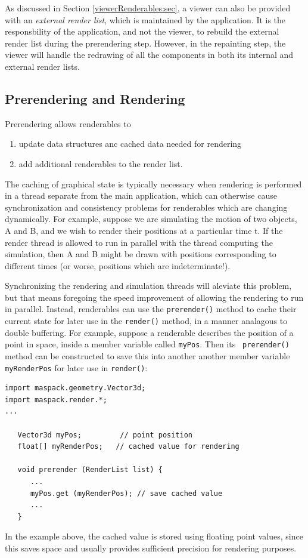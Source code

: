 As discussed in Section \ref{viewerRenderables:sec}, a viewer can also
be provided with an {\it external render list}, which is maintained by
the application. It is the responsbility of the application, and not
the viewer, to rebuild the external render list during the
prerendering step. However, in the repainting step, the viewer will
handle the redrawing of all the components in both its internal and
external render lists.

\subsection{Prerendering and Rendering}
\label{prerenderingAndRendering:sec}

Prerendering allows renderables to

\begin{enumerate}

\item update data structures anc cached data needed for rendering

\item add additional renderables to the render list.

\end{enumerate}

The caching of graphical state is typically necessary when rendering
is performed in a thread separate from the main application, which can
otherwise cause synchronization and consistency problems for
renderables which are changing dynamically. For example, suppose we
are simulating the motion of two objects, A and B, and we wish to
render their positions at a particular time t. If the render thread is
allowed to run in parallel with the thread computing the simulation,
then A and B might be drawn with positions corresponding to different
times (or worse, positions which are indeterminate!).

Synchronizing the rendering and simulation threads will aleviate this
problem, but that means foregoing the speed improvement of allowing
the rendering to run in parallel. Instead, renderables can use the
{\tt prerender()} method to cache their current state for later use in
the {\tt render()} method, in a manner analagous to double buffering.
For example, suppose a renderable describes the position of a point in
space, inside a member variable called {\tt myPos}. Then its {\tt
prerender()} method can be constructed to save this into
another another member variable {\tt myRenderPos} for later use in
{\tt render()}:
%
\begin{lstlisting}[]
import maspack.geometry.Vector3d;
import maspack.render.*;
...

   Vector3d myPos;         // point position
   float[] myRenderPos;   // cached value for rendering

   void prerender (RenderList list) {
      ...
      myPos.get (myRenderPos); // save cached value
      ...
   }
\end{lstlisting}
%
In the example above, the cached value is stored using floating point
values, since this saves space and usually provides sufficient
precision for rendering purposes.

